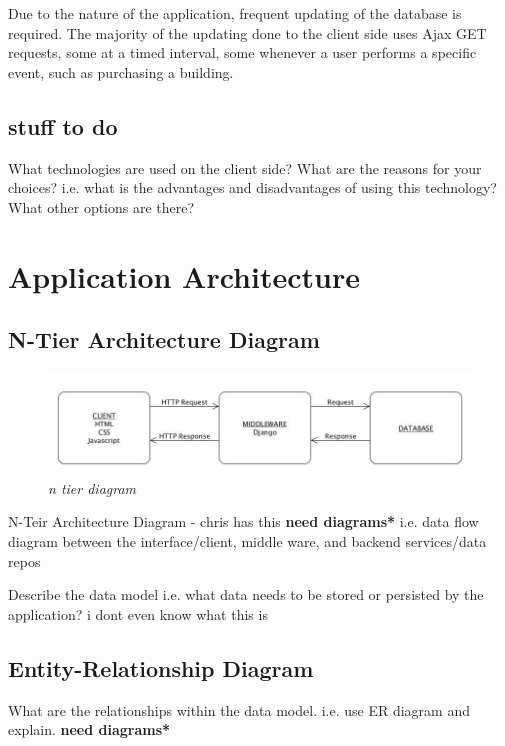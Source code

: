 \documentclass{sig-alt-release2}
\begin{document}
Due to the nature of the application, frequent updating of the database is required. The majority of the updating done to the client side uses Ajax GET requests, some at a timed interval, some whenever a user performs a specific event, such as purchasing a building.

\subsection{stuff to do} 

What technologies are used on the client side? 
What are the reasons for your choices? i.e. what is the advantages and disadvantages of using this technology? 
What other options are there? 

\section{Application Architecture}

\subsection{N-Tier Architecture Diagram}

\begin{figure}[!htbp]
  \caption{\textit{n tier diagram}}
  \begin{center}
		\includegraphics[scale=0.28]{img/NTIER.jpg}
  \end{center}
\end{figure}

N-Teir Architecture Diagram - chris has this {\bf *need diagrams*} 
i.e. data flow diagram between the interface/client, middle ware, and backend services/data repos

Describe the data model i.e. what data needs to be stored or persisted by the application? i dont even know what this is

\subsection{Entity-Relationship Diagram}

What are the relationships within the data model.
i.e. use ER diagram and explain. {\bf *need diagrams*} 
\end{document}
